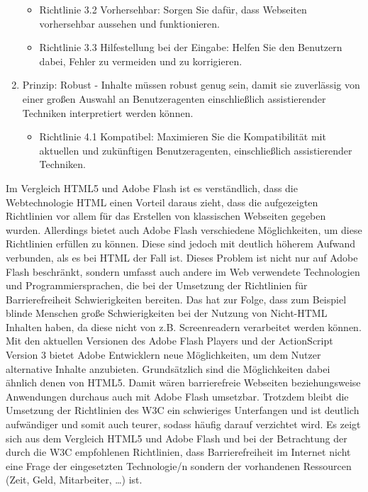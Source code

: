 \begin{enumerate}
\begin{itemize}
    \item Richtlinie 3.2 Vorhersehbar: Sorgen Sie dafür, dass Webseiten
    vorhersehbar aussehen und funktionieren.
    \item Richtlinie 3.3 Hilfestellung bei der Eingabe: Helfen Sie den
    Benutzern dabei, Fehler zu vermeiden und zu korrigieren.
  \end{itemize}
  \item Prinzip: Robust - Inhalte müssen robust genug sein, damit sie
  zuverlässig von einer großen Auswahl an Benutzeragenten einschließlich
  assistierender Techniken interpretiert werden können.
  \begin{itemize}
    \item Richtlinie 4.1 Kompatibel: Maximieren Sie die Kompatibilität mit
    aktuellen und zukünftigen Benutzeragenten, einschließlich assistierender
    Techniken.
  \end{itemize}
\end{enumerate}
Im Vergleich HTML5 und Adobe Flash ist es verständlich, dass die
Webtechnologie HTML einen Vorteil daraus zieht, dass die aufgezeigten
Richtlinien vor allem für das Erstellen von klassischen Webseiten gegeben
wurden. Allerdings bietet auch Adobe Flash verschiedene Möglichkeiten, um
diese Richtlinien erfüllen zu können. Diese sind jedoch mit deutlich höherem
Aufwand verbunden, als es bei HTML der Fall ist. Dieses Problem ist nicht nur
auf Adobe Flash beschränkt, sondern umfasst auch andere im Web verwendete
Technologien und Programmiersprachen, die bei der Umsetzung der Richtlinien für
Barrierefreiheit Schwierigkeiten bereiten. Das hat zur Folge, dass zum
Beispiel blinde Menschen große Schwierigkeiten bei der Nutzung von Nicht-HTML
Inhalten haben, da diese nicht von z.B. Screenreadern verarbeitet werden
können.
\newline\newline
Mit den aktuellen Versionen des Adobe Flash Players und der ActionScript
Version 3 bietet Adobe Entwicklern neue Möglichkeiten, um dem Nutzer
alternative Inhalte anzubieten. Grundsätzlich sind die Möglichkeiten dabei
ähnlich denen von HTML5. Damit wären barrierefreie Webseiten beziehungsweise
Anwendungen durchaus auch mit Adobe Flash umsetzbar. Trotzdem bleibt die
Umsetzung der Richtlinien des W3C ein schwieriges Unterfangen und ist deutlich
aufwändiger und somit auch teurer, sodass häufig darauf verzichtet wird.
\newline\newline
Es zeigt sich aus dem Vergleich HTML5 und Adobe Flash und bei der Betrachtung
der durch die W3C empfohlenen Richtlinien, dass Barrierefreiheit im Internet
nicht eine Frage der eingesetzten Technologie/n sondern der vorhandenen
Ressourcen (Zeit, Geld, Mitarbeiter, \dots) ist.

